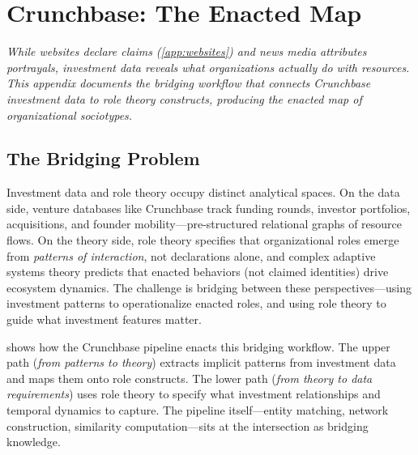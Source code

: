 \documentclass[../main.tex]{subfiles}
\begin{document}

\chapter{Crunchbase: The Enacted Map}
\label{app:crunchbase}

\noindent\textit{While websites declare claims (\cref{app:websites}) and news media attributes portrayals,
investment data reveals what organizations \emph{actually do} with resources.
This appendix documents the bridging workflow that connects Crunchbase investment data
to role theory constructs, producing the enacted map of organizational sociotypes.}

\bigskip


\section{The Bridging Problem}

Investment data and role theory occupy distinct analytical spaces.
On the data side, venture databases like Crunchbase track funding rounds,
investor portfolios, acquisitions, and founder mobility---pre-structured relational
graphs of resource flows.
On the theory side, role theory specifies that organizational roles emerge from
\emph{patterns of interaction}, not declarations alone, and complex adaptive
systems theory predicts that enacted behaviors (not claimed identities) drive
ecosystem dynamics.
The challenge is bridging between these perspectives---using investment patterns
to operationalize enacted roles, and using role theory to guide what investment
features matter.

 shows how the \RoleBox{} Crunchbase pipeline
enacts this bridging workflow.
The upper path (\textit{from patterns to theory}) extracts implicit patterns
from investment data and maps them onto role constructs.
The lower path (\textit{from theory to data requirements}) uses role theory
to specify what investment relationships and temporal dynamics to capture.
The pipeline itself---entity matching, network construction, similarity
computation---sits at the intersection as bridging knowledge.
\end{document}
